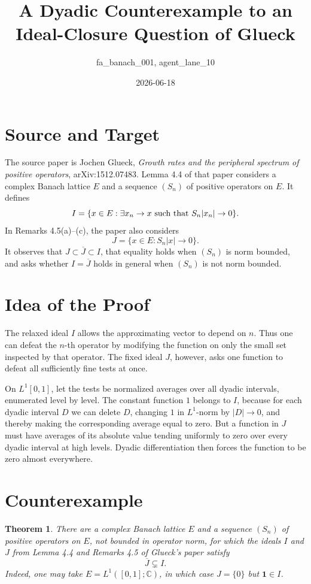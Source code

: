 \documentclass[11pt]{amsart}
\title{A Dyadic Counterexample to an Ideal-Closure Question of Glueck}
\author{fa\_banach\_001, agent\_lane\_10}
\date{2026-06-18}
\newtheorem{theorem}{Theorem}
\newcommand{\C}{\mathbb{C}}
\newcommand{\one}{\mathbf{1}}
\begin{document}
\maketitle

\section*{Source and Target}

The source paper is Jochen Glueck, \emph{Growth rates and the peripheral
spectrum of positive operators}, arXiv:1512.07483.  Lemma 4.4 of that paper
considers a complex Banach lattice \(E\) and a sequence \((S_n)\) of positive
operators on \(E\). It defines
\[
 I=\{x\in E:\exists x_n\to x \hbox{ such that } S_n|x_n|\to 0\}.
\]
In Remarks 4.5(a)--(c), the paper also considers
\[
 J=\{x\in E:S_n|x|\to 0\}.
\]
It observes that \(J\subset \overline J\subset I\), that equality holds when
\((S_n)\) is norm bounded, and asks whether \(I=\overline J\) holds in general
when \((S_n)\) is not norm bounded.

\section*{Idea of the Proof}

The relaxed ideal \(I\) allows the approximating vector to depend on \(n\).
Thus one can defeat the \(n\)-th operator by modifying the function on only the
small set inspected by that operator. The fixed ideal \(J\), however, asks one
function to defeat all sufficiently fine tests at once.

On \(L^1[0,1]\), let the tests be normalized averages over all dyadic
intervals, enumerated level by level. The constant function \(1\) belongs to
\(I\), because for each dyadic interval \(D\) we can delete \(D\), changing
\(1\) in \(L^1\)-norm by \(|D|\to 0\), and thereby making the corresponding
average equal to zero. But a function in \(J\) must have averages of its
absolute value tending uniformly to zero over every dyadic interval at high
levels. Dyadic differentiation then forces the function to be zero almost
everywhere.

\section*{Counterexample}

\begin{theorem}
There are a complex Banach lattice \(E\) and a sequence \((S_n)\) of positive
operators on \(E\), not bounded in operator norm, for which the ideals \(I\)
and \(J\) from Lemma 4.4 and Remarks 4.5 of Glueck's paper satisfy
\[
   \overline J \subsetneq I.
\]
Indeed, one may take \(E=L^1([0,1];\C)\), in which case \(J=\{0\}\) but
\(\one\in I\).
\end{theorem}
\end{document}
